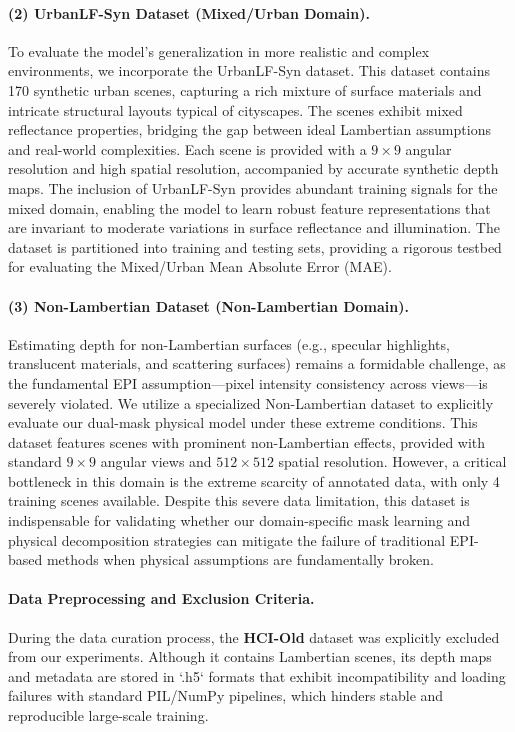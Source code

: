 \paragraph{(2) UrbanLF-Syn Dataset (Mixed/Urban Domain).}
To evaluate the model's generalization in more realistic and complex environments, we incorporate the UrbanLF-Syn dataset. This dataset contains 170 synthetic urban scenes, capturing a rich mixture of surface materials and intricate structural layouts typical of cityscapes. The scenes exhibit mixed reflectance properties, bridging the gap between ideal Lambertian assumptions and real-world complexities. Each scene is provided with a $9 \times 9$ angular resolution and high spatial resolution, accompanied by accurate synthetic depth maps. The inclusion of UrbanLF-Syn provides abundant training signals for the mixed domain, enabling the model to learn robust feature representations that are invariant to moderate variations in surface reflectance and illumination. The dataset is partitioned into training and testing sets, providing a rigorous testbed for evaluating the Mixed/Urban Mean Absolute Error (MAE).

\paragraph{(3) Non-Lambertian Dataset (Non-Lambertian Domain).}
Estimating depth for non-Lambertian surfaces (e.g., specular highlights, translucent materials, and scattering surfaces) remains a formidable challenge, as the fundamental EPI assumption—pixel intensity consistency across views—is severely violated. We utilize a specialized Non-Lambertian dataset to explicitly evaluate our dual-mask physical model under these extreme conditions. This dataset features scenes with prominent non-Lambertian effects, provided with standard $9 \times 9$ angular views and $512 \times 512$ spatial resolution. However, a critical bottleneck in this domain is the extreme scarcity of annotated data, with only 4 training scenes available. Despite this severe data limitation, this dataset is indispensable for validating whether our domain-specific mask learning and physical decomposition strategies can mitigate the failure of traditional EPI-based methods when physical assumptions are fundamentally broken.

\paragraph{Data Preprocessing and Exclusion Criteria.}
During the data curation process, the \textbf{HCI-Old} dataset was explicitly excluded from our experiments. Although it contains Lambertian scenes, its depth maps and metadata are stored in `.h5` formats that exhibit incompatibility and loading failures with standard PIL/NumPy pipelines, which hinders stable and reproducible large-scale training. 

